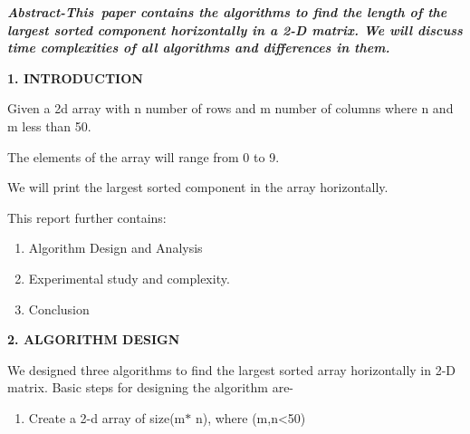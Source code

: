 \documentclass[12pt]{report}
\renewcommand{\_}{\kern-1.5pt\textunderscore\kern-1.5pt}
\begin{document}
\vspace{\baselineskip}
\begin{multicols}{2}

\vspace{\baselineskip}
\textbf{\textit{Abstract-This\ paper contains the algorithms to find the length of the largest sorted component horizontally  in a 2-D matrix. We will discuss time complexities of all algorithms and differences in them.}}\par


\vspace{\baselineskip}

\vspace{\baselineskip}
\begin{Center}
\textbf{1. INTRODUCTION}
\end{Center}\par

Given a 2d array with n number of rows and m number of columns where n and m less than 50.\par

The elements of the array will range from 0 to 9.\par

We will print the largest sorted component in the array horizontally.\par

This report further contains:\par

\begin{enumerate}
	\item Algorithm Design and Analysis\par

	\item Experimental study and complexity.\par

	\item Conclusion
\end{enumerate}\par


\vspace{\baselineskip}
\begin{Center}
\textbf{2. ALGORITHM DESIGN}
\end{Center}\par

We designed three algorithms to find the largest sorted array horizontally in 2-D matrix. Basic steps for designing the algorithm are-\par

\begin{enumerate}
	\item Create a 2-d array of size(m$\ast$ n), where (m,n<50)\par


\end{enumerate}
\end{multicols}
\end{document}
